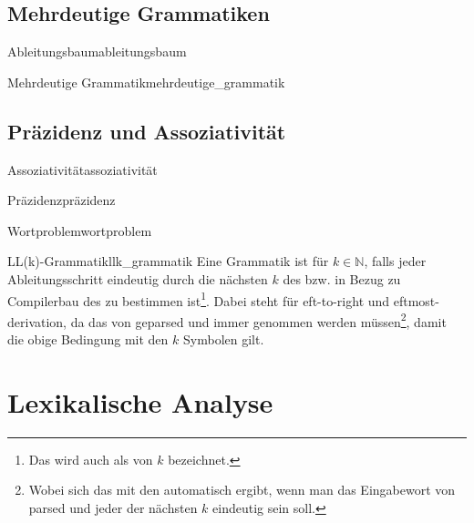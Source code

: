 \subsection{Mehrdeutige Grammatiken}
\begin{Definition}{Ableitungsbaum}{ableitungsbaum}
\end{Definition}
\begin{Definition}{Mehrdeutige Grammatik}{mehrdeutige_grammatik}
\end{Definition}
\subsection{Präzidenz und Assoziativität}
\begin{Definition}{Assoziativität}{assoziativität}
\end{Definition}
\begin{Definition}{Präzidenz}{präzidenz}
\end{Definition}
\begin{Definition}{Wortproblem}{wortproblem}
\end{Definition}
\begin{Definition}{LL(k)-Grammatik}{llk_grammatik}
  Eine Grammatik ist  für $k\in\mathbb{N}$, falls jeder Ableitungsschritt eindeutig durch die nächsten $k$  des  bzw. in Bezug zu Compilerbau  des  zu bestimmen ist\footnote{Das wird auch als  von $k$ bezeichnet.}. Dabei steht  für eft-to-right und eftmost-derivation, da das  von  geparsed und immer  genommen werden müssen\footnote{Wobei sich das mit den  automatisch ergibt, wenn man das Eingabewort von   parsed und jeder der nächsten $k$  eindeutig sein soll.}, damit die obige Bedingung mit den  $k$ Symbolen gilt.
\end{Definition}
\section{Lexikalische Analyse}
\label{sec:lexikalische_analyse}

